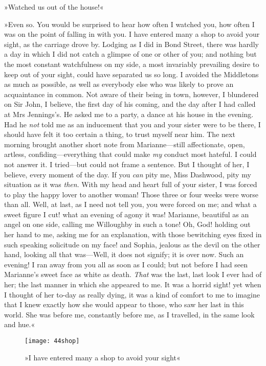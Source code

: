 »Watched us out of the house!«

»Even so. You would be surprised to hear how often I watched you, how often I was on the point of falling in with you. I have entered many a shop to avoid your sight, as the carriage drove by. Lodging as I did in Bond Street, there was hardly a day in which I did not catch a glimpse of one or other of you; and nothing but the most constant watchfulness on my side, a most invariably prevailing desire to keep out of your sight, could have separated us so long. I avoided the Middletons as much as possible, as well as everybody else who was likely to prove an acquaintance in common. Not aware of their being in town, however, I blundered on Sir John, I believe, the first day of his coming, and the day after I had called at Mrs Jennings’s. He asked me to a party, a dance at his house in the evening. Had he \textit{not} told me as an inducement that you and your sister were to be there, I should have felt it too certain a thing, to trust myself near him. The next morning brought another short note from Marianne—still affectionate, open, artless, confiding—everything that could make \textit{my} conduct most hateful. I could not answer it. I tried—but could not frame a sentence. But I thought of her, I believe, every moment of the day. If you \textit{can} pity me, Miss Dashwood, pity my situation as it was \textit{then}. With my head and heart full of your sister, I was forced to play the happy lover to another woman! Those three or four weeks were worse than all. Well, at last, as I need not tell you, you were forced on me; and what a sweet figure I cut! what an evening of agony it was! Marianne, beautiful as an angel on one side, calling me Willoughby in such a tone! Oh, God! holding out her hand to me, asking me for an explanation, with those bewitching eyes fixed in such speaking solicitude on my face! and Sophia, jealous as the devil on the other hand, looking all that was—Well, it does not signify; it is over now. Such an evening! I ran away from you all as soon as I could; but not before I had seen Marianne’s sweet face as white as death. \textit{That} was the last, last look I ever had of her; the last manner in which she appeared to me. It was a horrid sight! yet when I thought of her to-day as really dying, it was a kind of comfort to me to imagine that I knew exactly how she would appear to those, who saw her last in this world. She was before me, constantly before me, as I travelled, in the same look and hue.«

\begin{a4}
	\begin{figure}[tbph]
		\centering
		\texttt{[image: 44shop]}
		\caption{»I have entered many a shop to avoid your sight«}
	\end{figure}
\end{a4}

